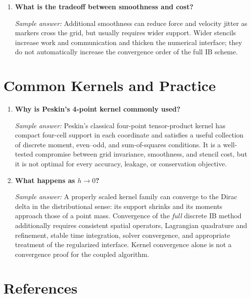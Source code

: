 \documentclass[11pt]{article}
\begin{document}
\begin{enumerate}[label=\arabic*., resume]
\item \textbf{What is the tradeoff between smoothness and cost?}

\textit{Sample answer:}  
Additional smoothness can reduce force and velocity jitter as markers cross the
grid, but usually requires wider support. Wider stencils increase work and
communication and thicken the numerical interface; they do not automatically
increase the convergence order of the full IB scheme.

\end{enumerate}

\section*{Common Kernels and Practice}

\begin{enumerate}[label=\arabic*., resume]

\item \textbf{Why is Peskin’s 4-point kernel commonly used?}

\textit{Sample answer:}  
Peskin's classical four-point tensor-product kernel has compact four-cell
support in each coordinate and satisfies a useful collection of discrete
moment, even--odd, and sum-of-squares conditions. It is a well-tested compromise
between grid invariance, smoothness, and stencil cost, but it is not optimal for
every accuracy, leakage, or conservation objective.

\item \textbf{What happens as $h \to 0$?}

\textit{Sample answer:}  
A properly scaled kernel family can converge to the Dirac delta in the
distributional sense: its support shrinks and its moments approach those of a
point mass. Convergence of the \emph{full} discrete IB method additionally
requires consistent spatial operators, Lagrangian quadrature and refinement,
stable time integration, solver convergence, and appropriate treatment of the
regularized interface. Kernel convergence alone is not a convergence proof for
the coupled algorithm.

\end{enumerate}

\section*{References}
\sloppy
\end{document}
